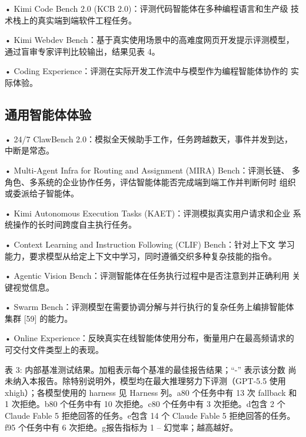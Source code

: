 • Kimi Code Bench 2.0 (KCB 2.0)：评测代码智能体在多种编程语言和生产级
技术栈上的真实端到端软件工程任务。

• Kimi Webdev Bench：基于真实使用场景中的高难度网页开发提示评测模型，
通过盲审专家评判比较输出，结果见表 4。

• Coding Experience：评测在实际开发工作流中与模型作为编程智能体协作的
实际体验。

\subsection{通用智能体体验}\label{general-agent-experience}

• 24/7 ClawBench 2.0：模拟全天候助手工作，任务跨越数天，事件并发到达，
中断是常态。

• Multi-Agent Infra for Routing and Assignment (MIRA) Bench：评测长链、
多角色、多系统的企业协作任务，评估智能体能否完成端到端工作并判断何时
组织或委派给子智能体。

• Kimi Autonomous Execution Tasks (KAET)：评测模拟真实用户请求和企业
系统操作的长时间跨度自主执行任务。

• Context Learning and Instruction Following (CLIF) Bench：针对上下文
学习能力，要求模型从给定上下文中学习，同时遵循交织多种复杂技能的指令。

• Agentic Vision Bench：评测智能体在任务执行过程中是否注意到并正确利用
关键视觉信息。

• Swarm Bench：评测模型在需要协调分解与并行执行的复杂任务上编排智能体
集群 {[}59{]} 的能力。

• Online Experience：反映真实在线智能体使用分布，衡量用户在最高频请求的
可交付文件类型上的表现。

表 3: 内部基准测试结果。加粗表示每个基准的最佳报告结果；``-'' 表示该分数
尚未纳入本报告。除特别说明外，模型均在最大推理努力下评测（GPT-5.5 使用
xhigh）；各模型使用的 harness 见 Harness 列。a80 个任务中有 13 次 fallback
和 1 次拒绝。b80 个任务中有 10 次拒绝。c80 个任务中有 3 次拒绝。d包含 2 个
Claude Fable 5 拒绝回答的任务。e包含 14 个 Claude Fable 5 拒绝回答的任务。
f95 个任务中有 6 次拒绝。g报告指标为 1 -- 幻觉率；越高越好。

